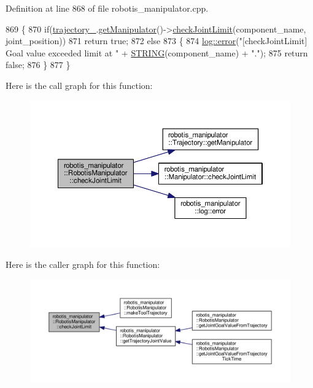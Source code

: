 Definition at line 868 of file robotis\+\_\+manipulator.\+cpp.


\begin{DoxyCode}
869 \{
870   \textcolor{keywordflow}{if}(\hyperlink{classrobotis__manipulator_1_1_robotis_manipulator_a992d2c7221bcaab8e9a688d12728d738}{trajectory\_}.\hyperlink{classrobotis__manipulator_1_1_trajectory_ae5276de42edf154de107c1f194f6b322}{getManipulator}()->\hyperlink{classrobotis__manipulator_1_1_manipulator_a715e5825f289765d1c6ce9687ce6c6e5}{checkJointLimit}(component\_name, 
      joint\_position))
871     \textcolor{keywordflow}{return} \textcolor{keyword}{true};
872   \textcolor{keywordflow}{else}
873   \{
874     \hyperlink{namespacerobotis__manipulator_1_1log_a6a84cb5481107ad244344093086fb557}{log::error}(\textcolor{stringliteral}{"[checkJointLimit] Goal value exceeded limit at "} + 
      \hyperlink{robotis__manipulator__log_8h_a67f156408fa9d656017c406fe4f4b330}{STRING}(component\_name) + \textcolor{stringliteral}{"."});
875     \textcolor{keywordflow}{return} \textcolor{keyword}{false};
876   \}
877 \}
\end{DoxyCode}


Here is the call graph for this function\+:\nopagebreak
\begin{figure}[H]
\begin{center}
\leavevmode
\includegraphics[width=350pt]{classrobotis__manipulator_1_1_robotis_manipulator_a37a3225fe662919d78e32b860e64e61a_cgraph}
\end{center}
\end{figure}




Here is the caller graph for this function\+:\nopagebreak
\begin{figure}[H]
\begin{center}
\leavevmode
\includegraphics[width=350pt]{classrobotis__manipulator_1_1_robotis_manipulator_a37a3225fe662919d78e32b860e64e61a_icgraph}
\end{center}
\end{figure}



